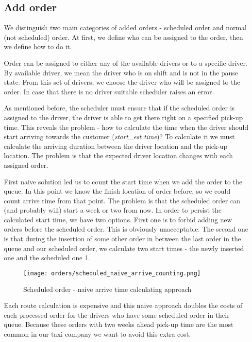 \subsection{Add order}
We distinguish two main categories of added orders - scheduled order and normal (not scheduled) order. At first, we define who can be assigned to the order, then we define how to do it.

Order can be assigned to either any of the available drivers or to a specific driver. By available driver, we mean the driver who is on shift and is not in the pause state. From this set of drivers, we choose the driver who will be assigned to the order. In case that there is no driver suitable scheduler raises an error.

As mentioned before, the scheduler must ensure that if the scheduled order is assigned to the driver, the driver is able to get there right on a specified pick-up time. This reveals the problem - how to calculate the time when the driver should start arriving towards the customer (\textit{start\_est time})? To calculate it we must calculate the arriving duration between the driver location and the pick-up location. The problem is that the expected driver location changes with each assigned order.

First naive solution led us to count the start time when we add the order to the queue. In this point we know the finish location of order before, so we could count arrive time from that point. The problem is that the scheduled order can (and probably will) start a week or two from now. In order to persist the calculated start time, we have two options. First one is to forbid adding new orders before the scheduled order. This is obviously unacceptable. The second one is that during the insertion of some other order in between the last order in the queue and our scheduled order, we calculate two start times - the newly inserted one and the scheduled one \ref{scheduled_naive_arrive_counting}. 

\begin{figure}[h]\centering
	\texttt{[image: orders/scheduled\_naive\_arrive\_counting.png]}
	\caption{Scheduled order - naive arrive time calculating approach} 
	\label{scheduled_naive_arrive_counting}
\end{figure} 

Each route calculation is expensive and this naive approach doubles the costs of each processed order for the drivers who have some scheduled order in their queue. Because these orders with two weeks ahead pick-up time are the most common in our taxi company we want to avoid this extra cost. 

